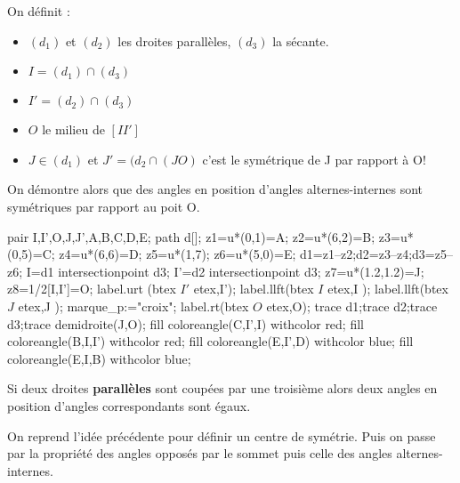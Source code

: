 \begin{preuve}

    \begin{minipage}{0.6\linewidth}
        On définit :
        \begin{itemize}
            \item  $(d_{1})$ et $(d_{2})$ les droites parallèles, $(d_{3})$ la sécante.
            \item  $I=(d_{1})\cap(d_{3})$
            \item  $I'=(d_{2})\cap(d_{3})$
            \item  $O$ le milieu de $[II']$
            \item  $J\in (d_{1})$ et $J'=(d_{2}\cap (JO)$ c'est le symétrique de J par rapport à O!
        \end{itemize}
        On démontre alors que des angles en position d'angles alternes-internes sont symétriques par rapport au poit O.
    \end{minipage}
    \hfill
    \begin{minipage}{0.3\linewidth}
        \begin{center}
            \begin{Geometrie}[CoinBG={(0,0.5u)},CoinHD={(6u,6.5u)}]
                    pair I,I',O,J,J',A,B,C,D,E;
                    path d[];
                    z1=u*(0,1)=A;
                    z2=u*(6,2)=B;
                    z3=u*(0,5)=C;
                    z4=u*(6,6)=D;
                    z5=u*(1,7);
                    z6=u*(5,0)=E;
                    d1=z1--z2;d2=z3--z4;d3=z5--z6;
                    I=d1 intersectionpoint d3;
                    I'=d2 intersectionpoint d3;
                    z7=u*(1.2,1.2)=J;
                    z8=1/2[I,I']=O;
                    label.urt (btex $I'$ etex,I');
                    label.llft(btex $I $ etex,I );
                    label.llft(btex $J $ etex,J );
                    marque_p:="croix";
                    label.rt(btex $O$ etex,O);
                    trace d1;trace d2;trace d3;trace demidroite(J,O);
                    fill coloreangle(C,I',I) withcolor red;
                    fill coloreangle(B,I,I') withcolor red;
                    fill coloreangle(E,I',D) withcolor blue;
                    fill coloreangle(E,I,B) withcolor blue;
            \end{Geometrie}
        \end{center}
    \end{minipage}

\end{preuve}

\begin{propriete}
    Si deux droites \textbf{parallèles} sont coupées par une troisième alors deux angles en position d'angles correspondants sont égaux.
\end{propriete}

\begin{preuve}
    On reprend l'idée précédente pour définir un centre de symétrie.
    Puis on passe par la propriété des angles opposés par le sommet puis celle des angles alternes-internes.
\end{preuve}
